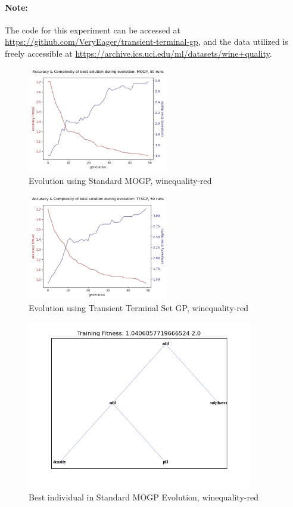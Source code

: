 \documentclass[a4paper]{article}
\begin{document}
\paragraph{Note:} The code for this experiment can be accessed at \url{https://github.com/VeryEager/transient-terminal-gp}, and the data utilized is freely accessible at \url{https://archive.ics.uci.edu/ml/datasets/wine+quality}.
\begin{figure}[H]
	\caption{Evolution using Standard MOGP, winequality-red}
	\centering
	\includegraphics[width=0.55\textwidth]{winequality-red-evo-MOGP}
\end{figure}
\begin{figure}[H]
	\caption{Evolution using Transient Terminal Set GP, winequality-red}
	\centering
	\includegraphics[width=0.55\textwidth]{winequality-red-evo-TTSGP}
\end{figure}
\begin{figure}[H]
	\caption{Best individual in Standard MOGP Evolution, winequality-red}
	\centering
	\includegraphics[width=0.875\textwidth]{winequality-red-MOGP-ex}
\end{figure}
\end{document}
